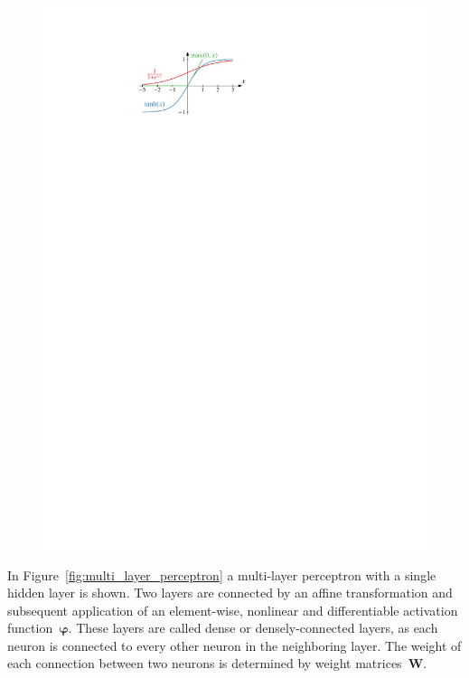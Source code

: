 \begin{figure}[htb]
\begin{minipage}[t]{0.4\textwidth}
    \includegraphics{./figures/theory/activation_functions.pdf}
    \label{fig:activation_functions}
  \end{minipage}
\end{figure}
In Figure~\ref{fig:multi_layer_perceptron} a multi-layer perceptron with a
single hidden layer is shown. Two layers are connected by an affine
transformation and subsequent application of an element-wise, nonlinear and
differentiable activation function~$\bm{\varphi}$. These layers are called dense
or densely-connected layers, as each neuron is connected to every other neuron
in the neighboring layer. The weight of each connection between two neurons is
determined by weight matrices~$\mathbf{W}$.
